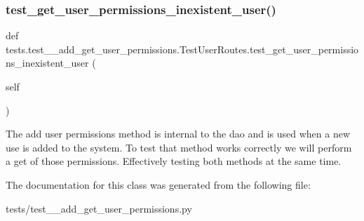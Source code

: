 \subsubsection{\texorpdfstring{test\+\_\+get\+\_\+user\+\_\+permissions\+\_\+inexistent\+\_\+user()}{test\_get\_user\_permissions\_inexistent\_user()}}
{\footnotesize\ttfamily def tests.\+test\+\_\+\_\+add\+\_\+get\+\_\+user\+\_\+permissions.\+Test\+User\+Routes.\+test\+\_\+get\+\_\+user\+\_\+permissions\+\_\+inexistent\+\_\+user (\begin{DoxyParamCaption}\item[{}]{self }\end{DoxyParamCaption})}

\begin{DoxyVerb}The add user permissions method is internal to the dao and is used when
a new use is added to the system. To test that method works correctly
we will perform a get of those permissions. Effectively testing both
methods at the same time.\end{DoxyVerb}
 

The documentation for this class was generated from the following file\+:\begin{DoxyCompactItemize}
\item 
tests/test\+\_\+\_\+add\+\_\+get\+\_\+user\+\_\+permissions.\+py\end{DoxyCompactItemize}
